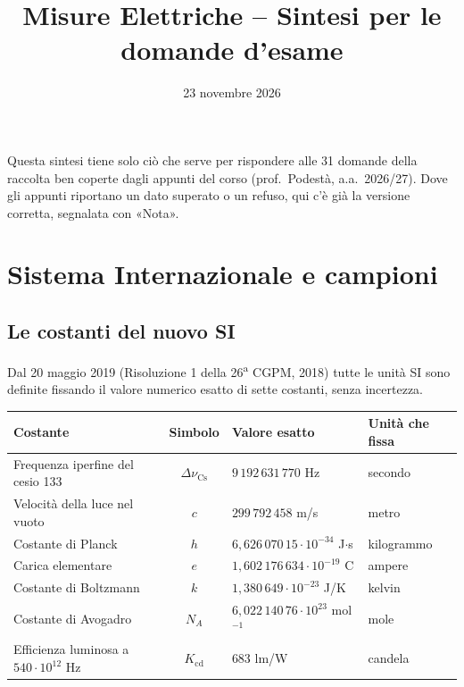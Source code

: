 \documentclass[11pt,a4paper]{article}
\title{\textbf{Misure Elettriche -- Sintesi per le domande d'esame}}
\author{}
\date{23 novembre 2026}
\begin{document}
\maketitle
\vspace{-2em}

Questa sintesi tiene solo ciò che serve per rispondere alle 31 domande della raccolta ben coperte dagli appunti del corso (prof.\ Podestà, a.a.\ 2026/27). Dove gli appunti riportano un dato superato o un refuso, qui c'è già la versione corretta, segnalata con «Nota».

\section*{Sistema Internazionale e campioni}

\subsection*{Le costanti del nuovo SI}

Dal 20 maggio 2019 (Risoluzione 1 della 26\textsuperscript{a} CGPM, 2018) tutte le unità SI sono definite fissando il valore numerico esatto di sette costanti, senza incertezza.

\begin{center}
\begin{tabularx}{\linewidth}{L c l l}
\toprule
\textbf{Costante} & \textbf{Simbolo} & \textbf{Valore esatto} & \textbf{Unità che fissa}\\
\midrule
Frequenza iperfine del cesio 133 & $\Delta\nu_{\mathrm{Cs}}$ & $9\,192\,631\,770$ Hz & secondo\\
Velocità della luce nel vuoto & $c$ & $299\,792\,458$ m/s & metro\\
Costante di Planck & $h$ & $6{,}626\,070\,15\cdot10^{-34}$ J$\cdot$s & kilogrammo\\
Carica elementare & $e$ & $1{,}602\,176\,634\cdot10^{-19}$ C & ampere\\
Costante di Boltzmann & $k$ & $1{,}380\,649\cdot10^{-23}$ J/K & kelvin\\
Costante di Avogadro & $N_A$ & $6{,}022\,140\,76\cdot10^{23}$ mol$^{-1}$ & mole\\
Efficienza luminosa a $540\cdot10^{12}$ Hz & $K_{\mathrm{cd}}$ & $683$ lm/W & candela\\
\bottomrule
\end{tabularx}
\end{center}
\end{document}
